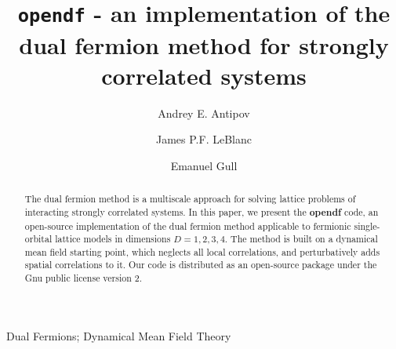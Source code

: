 \documentclass[3p,times,procedia]{elsarticle}
\begin{document}
\begin{frontmatter}




\title{\texttt{opendf} - an implementation of the dual fermion method for strongly correlated systems }




\author[a]{Andrey E. Antipov} 
\author[a]{James P.F. LeBlanc}
\author[a]{Emanuel Gull}

\address[a]{Department of Physics, University of Michigan, Ann Arbor, Michigan 48109, USA}

\begin{abstract}
The dual fermion method is a multiscale approach for solving lattice problems of interacting strongly correlated systems. In this paper, we present the \textbf{opendf} code, an open-source implementation of the dual fermion method applicable to fermionic single-orbital lattice models in dimensions $D=1,2,3,4$. The method is built on a dynamical mean field starting point, which neglects all local correlations, and perturbatively adds spatial correlations to it. Our code is distributed as an open-source package under the Gnu public license version 2.
\end{abstract}

\begin{keyword}
Dual Fermions; Dynamical Mean Field Theory
\end{keyword}
\end{frontmatter}
\end{document}
